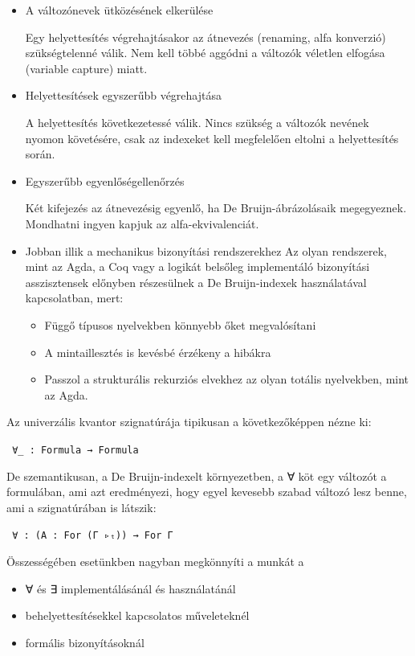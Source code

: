 \begin{itemize}
\item A változónevek ütközésének elkerülése

Egy helyettesítés végrehajtásakor az átnevezés (renaming, alfa konverzió) szükségtelenné válik. Nem kell többé aggódni a változók véletlen elfogása (variable capture) miatt.

\item Helyettesítések egyszerűbb végrehajtása

A helyettesítés következetessé válik. Nincs szükség a változók nevének nyomon követésére, csak az indexeket kell megfelelően eltolni a helyettesítés során.

\item Egyszerűbb egyenlőségellenőrzés

Két kifejezés az átnevezésig egyenlő, ha De Bruijn-ábrázolásaik megegyeznek. Mondhatni ingyen kapjuk az alfa-ekvivalenciát.

\item Jobban illik a mechanikus bizonyítási rendszerekhez
Az olyan rendszerek, mint az Agda, a Coq vagy a logikát belsőleg implementáló bizonyítási asszisztensek előnyben részesülnek a De Bruijn-indexek használatával kapcsolatban, mert:
\begin{itemize}
\item Függő típusos nyelvekben könnyebb őket megvalósítani
\item A mintaillesztés is kevésbé érzékeny a hibákra
\item Passzol a strukturális rekurziós elvekhez az olyan totális nyelvekben, mint az Agda.
\end{itemize}
\end{itemize}

Az univerzális kvantor szignatúrája tipikusan a következőképpen nézne ki:

\texttt{
∀\_ : Formula → Formula
}

De szemantikusan, a De Bruijn-indexelt környezetben, a ∀ köt egy változót a formulában, ami azt eredményezi, hogy egyel kevesebb szabad változó lesz benne, ami a szignatúrában is látszik:

\texttt{
∀ : (A : For (Γ ▹ₜ)) → For Γ
}

Összességében esetünkben nagyban megkönnyíti a munkát a
\begin{itemize}
\item ∀ és ∃ implementálásánál és használatánál
\item behelyettesítésekkel kapcsolatos műveleteknél
\item formális bizonyításoknál
\end{itemize}

